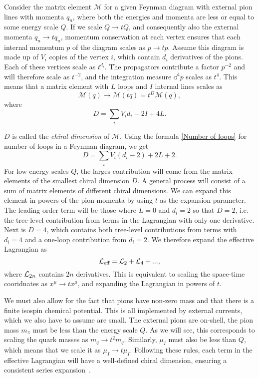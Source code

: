 Consider the matrix element $\mathcal M$ for a given Feynman diagram with external pion lines with momenta $q_n$, where both the energies and momenta are less or equal to some energy scale $Q$.
If we scale $Q\rightarrow tQ$, and consequently also the external momenta $q_n \rightarrow tq_n$, momentum conservation at each vertex ensures that each internal momentum $p$ of the diagram scales as $p \rightarrow tp$.
Assume this diagram is made up of $V_i$ copies of the vertex $i$, which contain $d_i$ derivatives of the pions.
Each of these vertices scale as $t^{d_i}$.
The propagators contribute a factor $p^{-2}$ and will therefore scale as $t^{-2}$, and the integration measure $\dd^4 p$ scales as $t^4$.
This means that a matrix element with $L$ loops and $I$ internal lines scales as
\begin{equation}
    \mathcal M(q) \rightarrow \mathcal M(t q) = t^D \mathcal M(q),
\end{equation}
where 
\begin{equation}
    D = \sum_i V_i d_i - 2 I + 4 L.
\end{equation}

$D$ is called the \emph{chiral dimension} of $\mathcal M$.
Using the formula \cref{Number of loops} for number of loops in a Feynman diagram, we get
\begin{equation}
    D = \sum_i V_i(d_i - 2) + 2 L + 2.
\end{equation}
For low energy scales $Q$, the larges contribution will come from the matrix elements of the smallest chiral dimension $D$.
A general process will consist of a sum of matrix elements of different chiral dimensions.
We can expand this element in powers of the pion momenta by using $t$ as the expansion parameter.
The leading order term will be those where $L = 0$ and $d_i = 2$ so that $D = 2$, i.e. the tree-level contribution from terms in the Lagrangian with only one derivative.
Next is $D = 4$, which contains both tree-level contributions from terms with $d_i = 4$ and a one-loop contribution from $d_i = 2$.
We therefore expand the effective Lagrangian as 
\begin{equation}
    \mathcal{L}_\text{eff} = \mathcal{L}_2 + \mathcal{L}_4 + ...,
\end{equation}
where $\mathcal{L}_{2n}$ contains $2n$ derivatives.
This is equivalent to scaling the space-time cooridnates as $x^\mu \rightarrow tx^\mu$, and expanding the Lagrangian in powers of $t$.

We must also allow for the fact that pions have non-zero mass and that there is a finite isospin chemical potential.
This is all implemented by external currents, which we also have to assume are small.
The external pions are on-shell, the pion mass $m_\pi$ must be less than the energy scale $Q$.
As we will see, this corresponds to scaling the quark masses as $m_q \rightarrow t^2 m_q$.
Similarly, $\mu_I$ must also be less than $Q$, which means that we scale it as $\mu_I\rightarrow t \mu_I$.
Following these rules, each term in the effective Lagrangian will have a well-defined chiral dimension, ensuring a consistent series expansion~\cite{weinberg_1996_vol2,WeinbergPhenom,Scherer2002IntroductionTC}.

